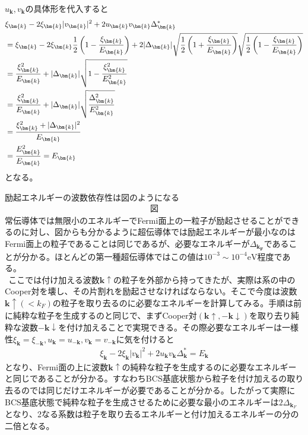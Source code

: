 \documentclass[dvipdfmx, 11pt, a4paper]{jsarticle}
\numberwithin{equation}{section}
\theoremstyle{definition}
\begin{document}
    \begin{derivationBox}
        $u_{\bm{k}},v_{\bm{k}}$の具体形を代入すると
        \begin{align}
            &\xi_{\bm{k}}-2\xi_{\bm{k}} |v_{\bm{k}}|^2 +2u_{\bm{k}}v_{\bm{k}} \Delta_{\bm{k}}^* \notag \\
            &=\xi_{\bm{k}} -2\xi_{\bm{k}} \frac{1}{2} \left( 1 - \frac{\xi_{\bm{k}}}{E_{\bm{k}}} \right) + 2 |\Delta_{\bm{k}}|\sqrt{\frac{1}{2} \left( 1 + \frac{\xi_{\bm{k}}}{E_{\bm{k}}} \right)} \sqrt{\frac{1}{2} \left( 1 - \frac{\xi_{\bm{k}}}{E_{\bm{k}}} \right)}  \notag \\
            &= \frac{\xi_{\bm{k}}^2}{E_{\bm{k}}} + |\Delta_{\bm{k}}|\sqrt{1 - \frac{\xi_{\bm{k}}^2}{E_{\bm{k}}^2}}\notag \\
            &= \frac{\xi_{\bm{k}}^2}{E_{\bm{k}}} + |\Delta_{\bm{k}}|\sqrt{\frac{\Delta_{\bm{k}}^2}{E_{\bm{k}}^2}} \notag \\
            &= \frac{\xi_{\bm{k}}^2 + |\Delta_{\bm{k}}|^2}{E_{\bm{k}}} \notag \\
            &= \frac{E_{\bm{k}}^2}{E_{\bm{k}}} = E_{\bm{k}}
        \end{align}
        となる。
    \end{derivationBox}
    励起エネルギーの波数依存性は図のようになる
    \begin{align}
        \textbf{図}
    \end{align}
    常伝導体では無限小のエネルギーでFermi面上の一粒子が励起させることができるのに対し、図からも分かるように超伝導体では励起エネルギーが最小なのはFermi面上の粒子であることは同じであるが、必要なエネルギーが$\Delta_{\bm{k_F}}$であることが分かる。ほとんどの第一種超伝導体ではこの値は$10^{-3}\sim10^{-4}\text{eV}$程度である。\\
    $\ \ $ここでは付け加える波数$\bm{k}\uparrow$の粒子を外部から持ってきたが、実際は系の中のCooper対を壊し、その片割れを励起させなければならない。そこで今度は波数$\bm{k}\uparrow(< k_F)$の粒子を取り去るのに必要なエネルギーを計算してみる。手順は前に純粋な粒子を生成するのと同じで、まずCooper対$(\bm{k}\uparrow,-\bm{k}\downarrow)$を取り去り純粋な波数$-\bm{k}\downarrow$を付け加えることで実現できる。その際必要なエネルギーは一様性$\xi_{\bm{k}}=\xi_{-\bm{k}},u_{\bm{k}}=u_{-\bm{k}},v_{\bm{k}}=v_{-\bm{k}}$に気を付けると
    \begin{align}
        \xi_{\bm{k}} -2\xi_{\bm{k}} |v_{\bm{k}}|^2 +2u_{\bm{k}}v_{\bm{k}} \Delta_{\bm{k}}^* = E_{\bm{k}} 
    \end{align}
    となり、Fermi面の上に波数$\bm{k}\uparrow$の純粋な粒子を生成するのに必要なエネルギーと同じであることが分かる。すなわちBCS基底状態から粒子を付け加えるの取り去るのでは同じだけエネルギーが必要であることが分かる。したがって実際にBCS基底状態で純粋な粒子を生成させるために必要な最小のエネルギーは$2\Delta_{\bm{k}_F}$となり、2なる系数は粒子を取り去るエネルギーと付け加えるエネルギーの分の二倍となる。
\end{document}
